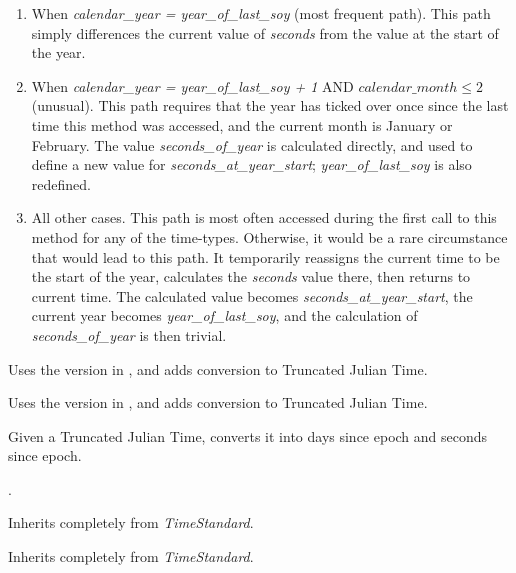 {\begin{enumerate}
{\begin{enumerate}
\begin{enumerate}
	\item When \textit{calendar\_year = year\_of\_last\_soy} (most 
	frequent path).  This path simply differences the current value of 
	\textit{seconds} from the value at the start of the year.
	\item When \textit{calendar\_year = year\_of\_last\_soy + 1} AND
  $calendar\_month \leqslant 2$ (unusual).  This path requires that the year 
  has ticked over once since the last time this method was accessed, and the 
  current month is January or February.  The value \textit{seconds\_of\_year} 
  is calculated directly, and used to define a new value for 
  \textit{seconds\_at\_year\_start}; \textit{year\_of\_last\_soy} is also 
  redefined.
	\item All other cases.  This path is most often accessed during the 
	first call to this method for any of the time-types.  Otherwise, it 
	would be a rare circumstance that would lead to this path.  It 
	temporarily reassigns the current time to be the start of the year, 
	calculates the \textit{seconds} value there, then returns to current 
	time.  The calculated value becomes \textit{seconds\_at\_year\_start}, 
	the current year becomes \textit{year\_of\_last\_soy}, and the 
	calculation of \textit{seconds\_of\_year} is then trivial.
\end{enumerate}




Uses the version in , and adds conversion to 
Truncated Julian Time.

Uses the version in , and adds conversion to 
Truncated Julian Time.

Given a Truncated Julian Time, converts it into days since epoch and
seconds since epoch.





\end{enumerate}}

  .


Inherits completely from \textit{TimeStandard}.



Inherits completely from \textit{TimeStandard}.



\end{enumerate}}
